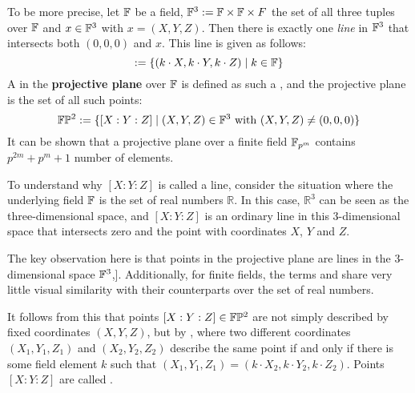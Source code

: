 To be more precise, let $\mathbb{F}$ be a field, $\mathbb{F}^3:=\mathbb{F}\times \mathbb{F}\times F$ the set of all three tuples over $\mathbb{F}$ and $x\in \mathbb{F}^3$ with $x=(X,Y,Z)$. Then there is exactly one \textit{line} in $\mathbb{F}^3$ that intersects both $(0,0,0)$ and $x$. This line is given as follows:
\begin{equation}
[X:Y:Z] := \{(k\cdot X,k\cdot Y, k\cdot Z)\;|\; k\in\F\}
\end{equation}
A  in the \textbf{projective plane} over $\mathbb{F}$ is defined as such a , and the projective plane is the set of all such points:
\begin{equation}
\mathbb{F}\mathbb{P}^2:=\{[X:Y:Z]\;|\; (X,Y,Z)\in \mathbb{F}^3\text{ with } (X,Y,Z)\neq (0,0,0)\}
\end{equation}
It can be shown that a projective plane over a finite field $\mathbb{F}_{p^m}$ contains $p^{2m}+p^m+1$ number of elements.

To understand why $[X:Y:Z]$ is called a line, consider the situation where the underlying field $\mathbb{F}$ is the set of real numbers $\mathbb{R}$. In this case, $\mathbb{R}^3$ can be seen as the three-dimensional space, and $[X:Y:Z]$ is  an ordinary line in this 3-dimensional space that intersects zero and the point with coordinates $X$, $Y$ and $Z$.

The key observation here is that points in the projective plane are lines in the $3$-dimensional space $\mathbb{F}^3$,]. Additionally, for finite fields, the terms  and  share very little visual similarity with their counterparts over the set of real numbers.

It follows from this that points $[X:Y:Z]\in \mathbb{F}\mathbb{P}^2$ are not simply described by fixed coordinates $(X,Y,Z)$, but by , where two different coordinates $(X_1,Y_1,Z_1)$ and $(X_2,Y_2,Z_2)$ describe the same point if and only if there is some field element $k$ such that $(X_1,Y_1,Z_1) = (k\cdot X_2,k\cdot Y_2,k\cdot Z_2)$. Points $[X:Y:Z]$ are called .

